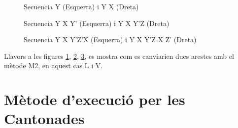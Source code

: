 \begin{figure}[!ht]
    \centering
    \begin{subfigure}
        \centering\RubikCubeSolvedWY
    \end{subfigure}
    \begin{subfigure}
        \centering\RubikCubeSolvedWY
    \end{subfigure}
    \caption{Secuencia Y (Esquerra) i Y X (Dreta)}
    \label{fig:m2c-1}
\end{figure}

\begin{figure}[!ht]
    \centering
    \begin{subfigure}
        \centering\RubikCubeSolvedWY
    \end{subfigure}
    \begin{subfigure}
        \centering\RubikCubeSolvedWY
    \end{subfigure}
    \caption{Secuencia Y X Y' (Esquerra) i Y X Y'Z (Dreta)}
    \label{fig:m2c-2}
\end{figure}

\begin{figure}[!ht]
    \centering
    \begin{subfigure}
        \centering\RubikCubeSolvedWY
    \end{subfigure}
    \begin{subfigure}
        \centering\RubikCubeSolvedWY
    \end{subfigure}
    \caption{Secuencia Y X Y'Z'X (Esquerra) i Y X Y'Z X Z' (Dreta)}
    \label{fig:m2c-3}
\end{figure}

Llavors a les figures \ref{fig:m2c-1}, \ref{fig:m2c-2}, \ref{fig:m2c-3}, es mostra com es canviarien dues arestes amb el mètode M2, en aquest cas L i V.


\section{Mètode d'execució per les Cantonades}

